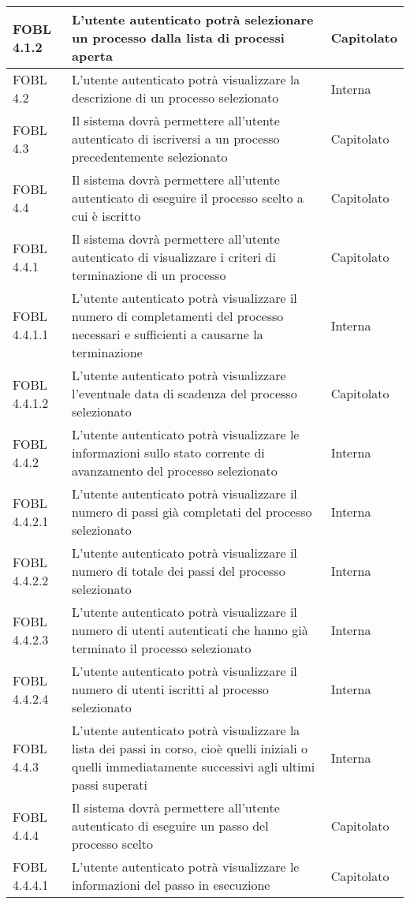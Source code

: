 \begin{longtable}{lXp{}}
\midrule
FOBL 4.1.2&L'utente autenticato potrà selezionare un processo dalla lista di processi aperta&Capitolato\\
\midrule
FOBL 4.2&L'utente autenticato potrà visualizzare la descrizione di un processo selezionato&Interna\\
\midrule
FOBL 4.3&Il sistema dovrà permettere all'utente autenticato di iscriversi a un processo precedentemente selezionato&Capitolato\\
\midrule
FOBL 4.4&Il sistema dovrà permettere all'utente autenticato di eseguire il processo scelto a cui è iscritto&Capitolato\\
\midrule
FOBL 4.4.1&Il sistema dovrà permettere all'utente autenticato di visualizzare i criteri di terminazione di un processo&Capitolato\\
\midrule
FOBL 4.4.1.1&L'utente autenticato potrà visualizzare il numero di completamenti del processo necessari e sufficienti a causarne la terminazione&Interna\\
\midrule
FOBL 4.4.1.2&L'utente autenticato potrà visualizzare l'eventuale data di scadenza del processo selezionato&Capitolato\\
\midrule
FOBL 4.4.2&L'utente autenticato potrà visualizzare le informazioni sullo stato corrente di avanzamento del processo selezionato&Interna\\
\midrule
FOBL 4.4.2.1&L'utente autenticato potrà visualizzare il numero di passi già completati del processo selezionato&Interna\\
\midrule
FOBL 4.4.2.2&L'utente autenticato potrà visualizzare il numero di totale dei passi del processo selezionato&Interna\\
\midrule
FOBL 4.4.2.3&L'utente autenticato potrà visualizzare il numero di utenti autenticati che hanno già terminato il processo selezionato&Interna\\
\midrule
FOBL 4.4.2.4&L'utente autenticato potrà visualizzare il numero di utenti iscritti al processo selezionato&Interna\\
\midrule
FOBL 4.4.3&L'utente autenticato potrà visualizzare la lista dei passi in corso, cioè quelli iniziali o quelli immediatamente successivi agli ultimi passi superati &Interna\\
\midrule
FOBL 4.4.4&Il sistema dovrà permettere all'utente autenticato di eseguire un passo del processo scelto&Capitolato\\
\midrule
FOBL 4.4.4.1&L'utente autenticato potrà visualizzare le informazioni del passo in esecuzione&Capitolato\\

\end{longtable}
